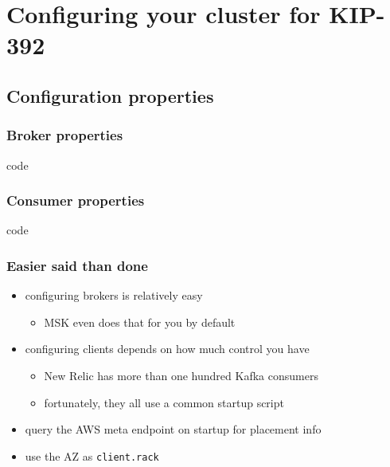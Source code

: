 \documentclass{beamer}
\newlength{\wideitemsep}
\let\olditem\item
\renewcommand{\item}{\setlength{\itemsep}{\wideitemsep}\olditem}
\begin{document}
\section{Configuring your cluster for KIP-392}
\subsection{Configuration properties}

\begin{frame}
  \frametitle{Broker properties}

  \begin{beamercolorbox}[sep=1em]{code}
    
  \end{beamercolorbox}

\end{frame}

\begin{frame}
  \frametitle{Consumer properties}

  \begin{beamercolorbox}[sep=1em]{code}
    
  \end{beamercolorbox}

\end{frame}

\begin{frame}
  \frametitle{Easier said than done}

  \begin{itemize}
  \item configuring \alert{brokers} is relatively easy
    \begin{itemize}
    \item MSK even does that for you by default
    \end{itemize}
  \item configuring \alert{clients} depends on how much control you have
    \begin{itemize}
    \item New Relic has more than \alert{one hundred} Kafka consumers
    \item fortunately, they all use a \alert{common startup script}
    \end{itemize}
  \item query the AWS \alert{meta endpoint} on startup for placement info
  \item use the AZ as \alert{\texttt{client.rack}}
  \end{itemize}
\end{frame}
\end{document}
